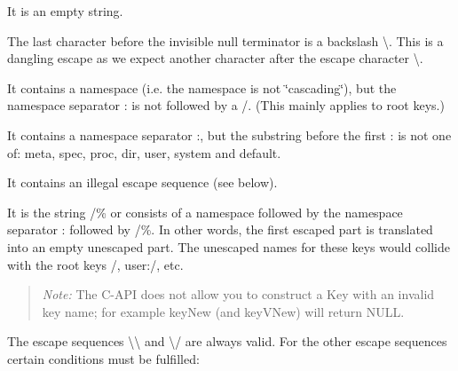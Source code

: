\begin{DoxyItemize}
\item It is an empty string.
\item The last character before the invisible null terminator is a backslash {\ttfamily \textbackslash{}}. This is a dangling escape as we expect another character after the escape character {\ttfamily \textbackslash{}}.
\item It contains a namespace (i.\+e. the namespace is not \char`\"{}cascading\char`\"{}), but the namespace separator {\ttfamily \+:} is not followed by a {\ttfamily /}. (This mainly applies to root keys.)
\item It contains a namespace separator {\ttfamily \+:}, but the substring before the first {\ttfamily \+:} is not one of\+: {\ttfamily meta}, {\ttfamily spec}, {\ttfamily proc}, {\ttfamily dir}, {\ttfamily user}, {\ttfamily system} and {\ttfamily default}.
\item It contains an illegal escape sequence (see below).
\item It is the string {\ttfamily /\%} or consists of a namespace followed by the namespace separator {\ttfamily \+:} followed by {\ttfamily /\%}. In other words, the first escaped part is translated into an empty unescaped part. The unescaped names for these keys would collide with the root keys {\ttfamily /}, {\ttfamily user\+:/}, etc.
\end{DoxyItemize}

\begin{quote}
{\itshape Note\+:} The C-\/\+A\+PI does not allow you to construct a {\ttfamily Key} with an invalid key name; for example {\ttfamily key\+New} (and {\ttfamily key\+V\+New}) will return {\ttfamily N\+U\+LL}. \end{quote}


The escape sequences {\ttfamily \textbackslash{}\textbackslash{}} and {\ttfamily \textbackslash{}/} are always valid. For the other escape sequences certain conditions must be fulfilled\+:


